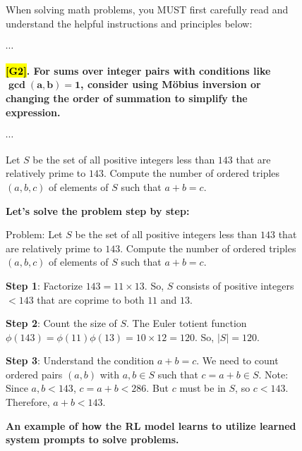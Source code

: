 \documentclass{article}
\theoremstyle{plain}
\theoremstyle{definition}
\theoremstyle{remark}
\begin{document}
\begin{figure}[!tb]
\centering
\caption{\textbf{An example of how the RL model learns to utilize learned system prompts to solve problems.}}

\begin{runcard}[title={Example of How E-SPL Shapes Model Behavior}]

\medskip

\begin{runbox}[title={\textbf{Learned System Prompt}}]
When solving math problems, you MUST first carefully read and understand the helpful instructions and principles below:

$\cdots$

\textbf{\color{Brown}\hl{{[G2]}}. For sums over integer pairs with conditions like $\boldsymbol{\gcd(a,b)=1}$, consider using Möbius inversion or changing the order of summation to simplify the expression.}

$\cdots$

\end{runbox}

\begin{runbox}[title={Problem}]
Let $S$ be the set of all positive integers less than $143$ that are relatively prime to $143$. Compute the number of ordered triples $(a,b,c)$ of elements of $S$ such that $a+b=c$.

\end{runbox}

\begin{runbox}[title={Model Output}]

\textbf{Let's solve the problem step by step:}

Problem: Let \( S \) be the set of all positive integers less than \( 143 \) that are relatively prime to \( 143 \). Compute the number of ordered triples \( (a, b, c) \) of elements of \( S \) such that \( a + b = c \).

\medskip
\textbf{Step 1}: Factorize \( 143 = 11 \times 13 \). So, \( S \) consists of positive integers \( < 143 \) that are coprime to both $11$ and $13$.

\textbf{Step 2}: Count the size of \( S \). The Euler totient function \( \phi(143) = \phi(11)\phi(13) = 10 \times 12 = 120 \). So, \( |S| = 120 \).

\textbf{Step 3}: Understand the condition \( a + b = c \). We need to count ordered pairs \( (a, b) \) with \( a, b \in S \) such that \( c = a + b \in S \).  Note: Since \( a, b < 143 \), \( c = a + b < 286 \). But \( c \) must be in \( S \), so \( c < 143 \). Therefore, \( a + b < 143 \).


\end{runbox}
\end{runcard}
\end{figure}
\end{document}
